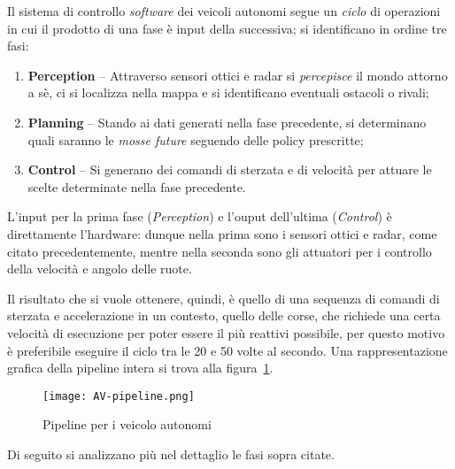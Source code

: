 \bigskip
\noindent Il sistema di controllo \emph{software} dei veicoli autonomi segue un \textit{ciclo} di
operazioni in cui il prodotto di una fase è input della successiva; si identificano in ordine tre fasi:
\begin{enumerate}
\item \textbf{Perception} -- Attraverso sensori ottici e radar si \emph{percepisce} il mondo attorno a sè,
	  ci si localizza nella mappa e si identificano eventuali ostacoli o rivali;
\item \textbf{Planning} -- Stando ai dati generati nella fase precedente,
	  si determinano quali saranno le \emph{mosse future} seguendo delle policy prescritte;
\item \textbf{Control} -- Si generano dei comandi di sterzata e di velocità per attuare le scelte
	  determinate nella fase precedente.
\end{enumerate}

L'input per la prima fase (\textit{Perception}) e l'ouput dell'ultima (\textit{Control})
è direttamente l'hardware: dunque nella prima sono i sensori ottici e radar, come citato precedentemente,
mentre nella seconda sono gli attuatori per i controllo della velocità e angolo delle ruote.

Il risultato che si vuole ottenere, quindi, è quello di una sequenza di comandi di sterzata e
accelerazione in un contesto, quello delle corse, che richiede una certa velocità di esecuzione per poter
essere il più reattivi possibile, per questo motivo è preferibile eseguire il ciclo tra le 20 e 50 volte
al secondo. Una rappresentazione grafica della pipeline intera si trova alla figura~\ref{fig:av-pipeline}.

\begin{figure}[H]
\centering
\caption{Pipeline per i veicolo autonomi \cite{overview}}
\texttt{[image: AV-pipeline.png]}
\label{fig:av-pipeline}
\end{figure}

Di seguito si analizzano più nel dettaglio le fasi sopra citate.
